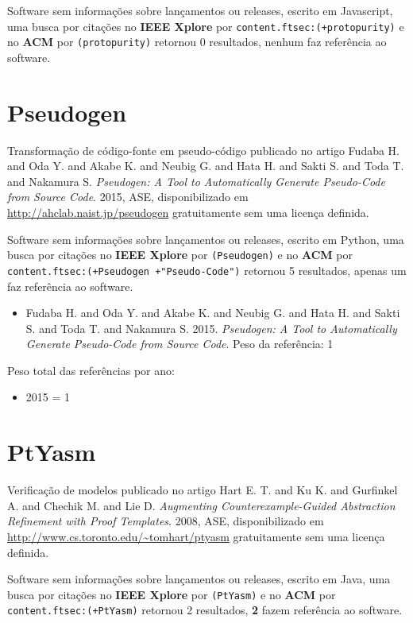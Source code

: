 Software sem informações sobre lançamentos ou releases,
escrito em Javascript,
uma busca por citações no {\bf IEEE Xplore} por
\texttt{content.ftsec:(+protopurity)}
e no {\bf ACM} por
\texttt{(protopurity)}
retornou
0 resultados,
nenhum faz referência ao software.


\section{Pseudogen}

Transformação de código-fonte em pseudo-código
publicado no artigo
Fudaba H. and Oda Y. and Akabe K. and Neubig G. and Hata H. and Sakti S. and Toda T. and Nakamura S.
{\it Pseudogen: A Tool to Automatically Generate Pseudo-Code from Source Code}.
2015,
ASE,
disponibilizado em \url{http://ahclab.naist.jp/pseudogen}
gratuitamente
sem uma licença definida.

Software sem informações sobre lançamentos ou releases,
escrito em Python,
uma busca por citações no {\bf IEEE Xplore} por
\texttt{(Pseudogen)}
e no {\bf ACM} por
\texttt{content.ftsec:(+Pseudogen +"Pseudo-Code")}
retornou
5 resultados,
apenas um faz referência ao software.

\begin{itemize}
\item Fudaba H. and Oda Y. and Akabe K. and Neubig G. and Hata H. and Sakti S. and Toda T. and Nakamura S.
      2015.
      {\it Pseudogen: A Tool to Automatically Generate Pseudo-Code from Source Code}.
      Peso da referência: 1
\end{itemize}

Peso total das referências por ano:

\begin{itemize}
\item 2015 = 1
\end{itemize}


\section{PtYasm}

Verificação de modelos
publicado no artigo
Hart E. T. and Ku K. and Gurfinkel A. and Chechik M. and Lie D.
{\it Augmenting Counterexample-Guided Abstraction Refinement with Proof Templates}.
2008,
ASE,
disponibilizado em \url{http://www.cs.toronto.edu/~tomhart/ptyasm}
gratuitamente
sem uma licença definida.

Software sem informações sobre lançamentos ou releases,
escrito em Java,
uma busca por citações no {\bf IEEE Xplore} por
\texttt{(PtYasm)}
e no {\bf ACM} por
\texttt{content.ftsec:(+PtYasm)}
retornou
2 resultados,
{\bf 2} fazem referência ao software.

